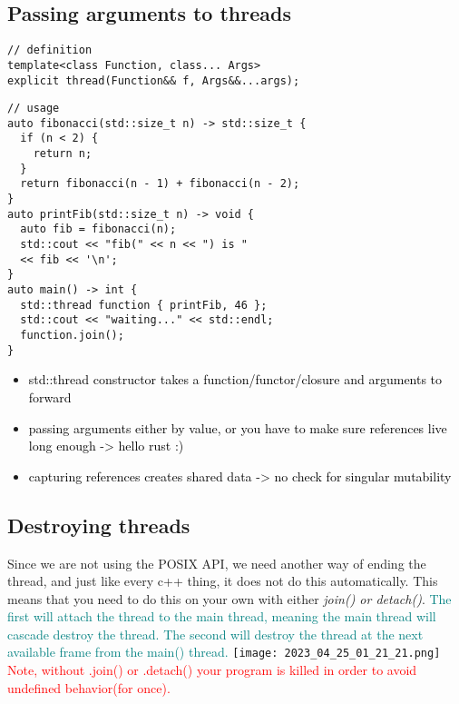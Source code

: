 \documentclass[main.tex,fontsize=8pt,paper=a4,paper=portrait,DIV=calc,]{scrartcl}
\begin{document}
\subsection{Passing arguments to threads}
\begin{lstlisting}
// definition
template<class Function, class... Args>
explicit thread(Function&& f, Args&&...args);
\end{lstlisting}

\begin{lstlisting}
// usage
auto fibonacci(std::size_t n) -> std::size_t {
  if (n < 2) {
    return n;
  }
  return fibonacci(n - 1) + fibonacci(n - 2);
}
auto printFib(std::size_t n) -> void {
  auto fib = fibonacci(n);
  std::cout << "fib(" << n << ") is "
  << fib << '\n';
}
auto main() -> int {
  std::thread function { printFib, 46 };
  std::cout << "waiting..." << std::endl;
  function.join();
}
\end{lstlisting}
\begin{itemize}
\item \textcolor{black}{std::thread constructor takes a function/functor/closure and arguments to forward}
\item \textcolor{black}{passing arguments either by value, or you have to make sure references live long enough -> hello rust :)}
\item \textcolor{black}{capturing references creates shared data -> no check for singular mutability}
\end{itemize} 


\subsection{Destroying threads}
Since we are not using the POSIX API, we need another way of ending the thread, and just like every c++ thing, it does not do this automatically.\newline
This means that you need to do this on your own with either \emph{join() or detach()}.\newline
\textcolor{teal}{The first will attach the thread to the main thread, meaning the main thread will cascade destroy the thread.}\newline
\textcolor{teal}{The second will destroy the thread at the next available frame from the main() thread.}\newline
\texttt{[image: 2023\_04\_25\_01\_21\_21.png]}\newline
\textcolor{red}{Note, without .join() or .detach() your program is killed in order to avoid undefined behavior(for once).}
\end{document}
